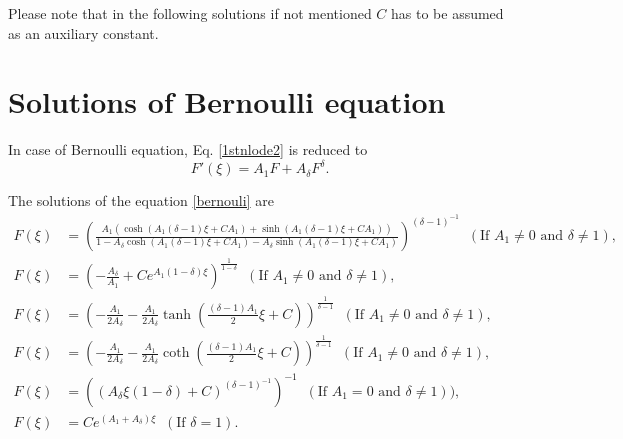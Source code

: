 \documentclass[prd,aps,floats,showkeys,nofootinbib,notitlepage]{revtex4-2}
\begin{document}
	Please note that in the following solutions if not mentioned $C$ has to be assumed as an auxiliary constant.
	
	\renewcommand{\theequation}{B-\arabic{equation}}
	\section{Solutions of Bernoulli equation}\label{sec:appenB}
	
	In case of Bernoulli equation, Eq. \eqref{1stnlode2} is reduced to
	\begin{equation}\label{bernouli}
		F'\left( \xi  \right) = {A_1}F + {A_\delta}F^{\delta}.
	\end{equation} 
	
	The solutions of the equation \eqref{bernouli} are \cite{yang}
	\begin{subequations}\label{bernouli_solu}
		\begin{align}
			F\left( \xi  \right) &= {\left( {\frac{{{A_1} \left( {\cosh \left( {{A_1}\left( {\delta - 1} \right) \xi + {C} {A_1}} \right) + \sinh \left( {{A_1} \left( {\delta - 1} \right)\xi + {C} {A_1}} \right)} \right)}}{{1 - {A_\delta} \cosh \left( {{A_1}\left( {\delta - 1} \right) \xi + {C} {A_1}} \right) - {A_\delta} \sinh \left( {{A_1}\left( {\delta - 1} \right) \xi + {C} {A_1}} \right)}}} \right)^{{{\left( {\delta - 1} \right)}^{ - 1}}}} \;\;(\text{If } A_1\neq 0\text{ and }\delta \neq 1),\\
			F\left( \xi  \right) &= {\left( { - \frac{{{A_\delta }}}{{{A_1}}} + C{e^{{A_1}(1 - \delta )\xi }}} \right)^{ \frac{1}{{1 - \delta }}}}\;\;(\text{If } A_1\neq 0\text{ and }\delta \neq 1), \\
			F\left( \xi  \right) &= {\left( { - \frac{{{A_1}}}{{2{A_\delta }}} - \frac{{{A_1}}}{{2{A_\delta }}}\tanh \left( {\frac{{(\delta  - 1){A_1}}}{2}\xi  + C} \right)} \right)^{\frac{1}{{\delta  - 1}}}}\;\;(\text{If } A_1\neq 0\text{ and }\delta \neq 1),\\
			F\left( \xi  \right) &= {\left( { - \frac{{{A_1}}}{{2{A_\delta }}} - \frac{{{A_1}}}{{2{A_\delta }}}\coth \left( {\frac{{(\delta  - 1){A_1}}}{2}\xi  + C} \right)} \right)^{\frac{1}{{\delta  - 1}}}}\;\;(\text{If } A_1\neq 0\text{ and }\delta \neq 1), \\ 
			F\left( \xi  \right) &= {\left( {{{\left( {{A_\delta} \xi(1 -  \delta) + {C}} \right)}^{{{\left( {\delta - 1} \right)}^{ - 1}}}}} \right)^{ - 1}} \;\;(\text{If } A_1=0 \text{ and } \delta \neq 1)),\\
			F\left( \xi  \right) &= C e^{({A_1} + {A_\delta })\xi }\;\; (\text{If }\delta = 1).
		\end{align}
	\end{subequations}
	
\end{document}
